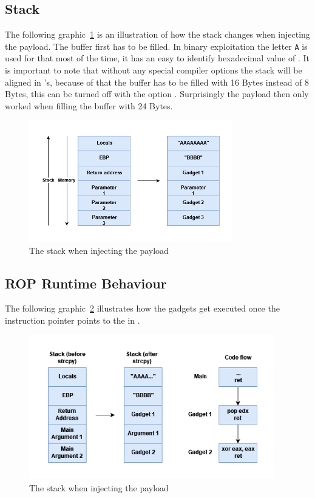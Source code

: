 \documentclass[journal=tosc,submission, notanonymous]{iacrtrans}
\begin{document}
\subsection{Stack}
The following graphic~\cref{fig:stack} is an illustration of how the stack changes when injecting the payload. The buffer first has to be filled. In binary exploitation the letter \Verb+A+ is used for that most of the time, it has an easy to identify hexadecimal value of . It is important to note that without any special compiler options the stack will be aligned in 's, because of that the buffer has to be filled with 16 Bytes instead of 8 Bytes, this can be turned off with the option . Surprisingly the payload then only worked when filling the buffer with 24 Bytes.
\begin{figure}[h!]
  \centering
  \includegraphics[width=0.79\textwidth]{stackropoffsec.png}
  \caption{The stack when injecting the payload}
  \label{fig:stack}
\end{figure}
\subsection{ROP Runtime Behaviour}
The following graphic~\cref{fig:executionatruntime} illustrates how the gadgets get executed once the instruction pointer  points to the  in .
\begin{figure}[h!]
  \centering
  \includegraphics[width=0.95\textwidth]{Ropchaineffect.png}
  \caption{The stack when injecting the payload}
  \label{fig:executionatruntime}
\end{figure}
\end{document}
